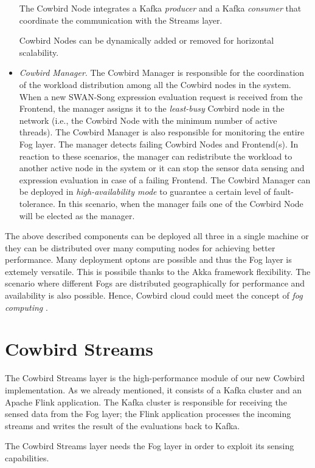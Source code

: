 \begin{itemize}
The Cowbird Node integrates a Kafka \emph{producer} and a Kafka \emph{consumer} that coordinate the communication with the Streams layer. 

Cowbird Nodes can be dynamically added or removed for horizontal scalability.

\item \emph{Cowbird Manager}. The Cowbird Manager is responsible for the coordination of the workload distribution among all the Cowbird nodes in the system. When a new SWAN-Song expression evaluation request is received from the Frontend, the manager assigns it to the \emph{least-busy} Cowbird node in the network (i.e., the Cowbird Node with the minimum number of active threads). The Cowbird Manager is also responsible for monitoring the entire Fog layer. The manager detects failing Cowbird Nodes and Frontend(s). In reaction to these scenarios, the manager can redistribute the workload to another active node in the system or it can stop the sensor data sensing and expression evaluation in case of a failing Frontend. The Cowbird Manager can be deployed in \emph{high-availability mode} to guarantee a certain level of fault-tolerance. In this scenario, when the manager fails one of the Cowbird Node will be elected as the manager. 
\end{itemize}

The above described components can be deployed all three in a single machine or they can be distributed over many computing nodes for achieving better performance. Many deployment optons are possible and thus the Fog layer is extemely versatile. This is possibile thanks to the Akka framework flexibility. The scenario where different Fogs are distributed geographically for performance and availability is also possible. Hence, Cowbird cloud could meet the concept of \emph{fog computing} \cite{fogcomputingBonomi2012}. 

\section{Cowbird Streams}
The Cowbird Streams layer is the high-performance module of our new Cowbird implementation. As we already mentioned, it consists of a Kafka cluster and an Apache Flink application. The Kafka cluster is responsible for receiving the sensed data from the Fog layer; the Flink application processes the incoming streams and writes the result of the evaluations back to Kafka.

The Cowbird Streams layer needs the Fog layer in order to exploit its sensing capabilities. 

